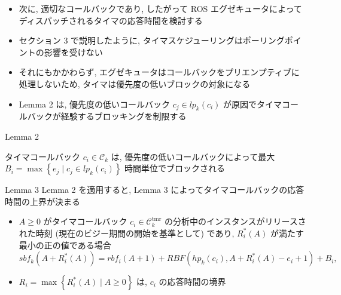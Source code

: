 \begin{frame}{}
    \begin{itemize}
        \item 次に, 適切なコールバックであり, したがって ROS エグゼキュータによってディスパッチされるタイマの応答時間を検討する
        \item セクション 3 で説明したように, タイマスケジューリングはポーリングポイントの影響を受けない
        \item それにもかかわらず, エグゼキュータはコールバックをプリエンプティブに処理しないため, タイマは優先度の低いブロックの対象になる
        \item Lemma 2 は, 優先度の低いコールバック $c_{j} \in l p_{k}\left(c_{i}\right)$ が原因でタイマコールバックが経験するブロッキングを制限する
    \end{itemize}
\end{frame}

\begin{frame}[label=lemma2]{Lemma 2}
    \begin{lemma}[]
        タイマコールバック $c_{i} \in \mathcal{C}_{k}$ は, 優先度の低いコールバックによって最大 $B_{i}=\max \left\{e_{j} \mid c_{j} \in l p_{k}\left(c_{i}\right)\right\}$ 時間単位でブロックされる
    \end{lemma}
\end{frame}

\begin{frame}[label=lemma3]{Lemma 3}
    Lemma 2 を適用すると, Lemma 3 によってタイマコールバックの応答時間の上界が決まる
    \begin{lemma}[]
        \begin{itemize}
            \item $A \geq 0$ がタイマコールバック $c_{i} \in \mathcal{C}_{k}^{\mathrm{tmr}}$ の分析中のインスタンスがリリースされた時刻 (現在のビジー期間の開始を基準として) であり, $R_{i}^{*}(A)$ が満たす最小の正の値である場合
                  \begin{equation*}
                      s b f_{k}\left(A+R_{i}^{*}(A)\right)=r b f_{i}(A+1)+R B F\left(h p_{k}\left(c_{i}\right), A+R_{i}^{*}(A)-e_{i}+1\right)+B_{i},
                  \end{equation*}
            \item $R_{i}=\max \left\{R_{i}^{*}(A) \mid A \geq 0\right\}$ は, $c_{i}$ の応答時間の境界
        \end{itemize}
    \end{lemma}
\end{frame}

